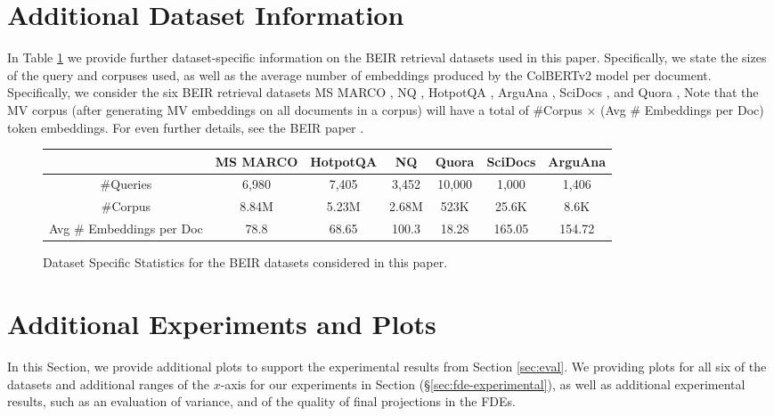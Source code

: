 


\section{Additional Dataset Information}\label{app:datasets}
In Table \ref{fig:dataset} we provide further dataset-specific information on the BEIR retrieval datasets used in this paper. Specifically, we state the sizes of the query and corpuses used, as well as the average number of embeddings produced by the ColBERTv2 model per document. Specifically, we consider the six BEIR retrieval datasets MS MARCO \cite{nguyen2016ms},
NQ \cite{kwiatkowski2019natural},
HotpotQA \cite{yang2018hotpotqa},
ArguAna \cite{wachsmuth2018retrieval},
SciDocs \cite{cohan2020specter},  and
Quora \cite{thakur2021beir}, Note that the MV corpus (after generating MV embeddings on all documents in a corpus) will have a total of $\#$Corpus $\times$ (Avg $\#$ Embeddings per Doc) token embeddings. 
For even further details, see the BEIR paper \cite{thakur2021beir}. 



\begin{figure}[h]
    \centering
    \begin{tabular}{|c|c|c|c|c|c|c|} %
\hline %
& MS MARCO & HotpotQA & NQ  & Quora & SciDocs &  ArguAna \\ \hline
$\#$Queries & 6,980 &7,405 & 3,452& 10,000 &1,000 &  1,406 \\ \hline
$\#$Corpus &8.84M & 5.23M &  2.68M  &523K & 25.6K  & 8.6K  \\\hline
\makecell{Avg \\$\#$ Embeddings\\ per Doc}
 & 78.8&	68.65&	100.3 & 18.28 &	165.05 &	154.72 \\\hline
\end{tabular}
    \caption{Dataset Specific Statistics for the BEIR datasets considered in this paper. }
    \label{fig:dataset}
\end{figure}

\section{Additional Experiments and Plots} \label{sec:additional-plots}
In this Section, we provide additional plots to support the experimental results from Section \ref{sec:eval}. We providing plots for all six of the datasets and additional ranges of the $x$-axis for our experiments in Section (§\ref{sec:fde-experimental}), as well as additional experimental results, such as an evaluation of variance, and of the quality of final projections in the FDEs. 

